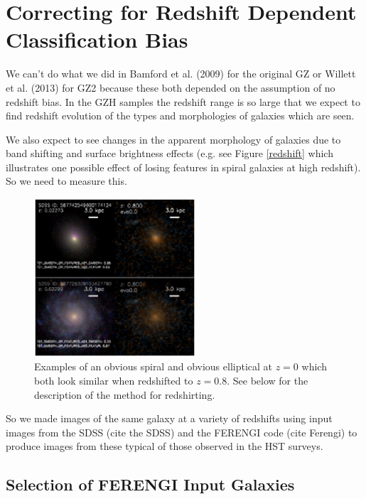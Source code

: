 \documentclass[usenatbib]{mn2e}
\begin{document}
\section{Correcting for Redshift Dependent Classification Bias}

We can't do what we did in Bamford et al. (2009) for the original GZ or Willett et al. (2013) for GZ2 because these both depended on the assumption of no redshift bias. In the GZH samples the redshift range is so large that we expect to find redshift evolution of the types and morphologies of galaxies which are seen. 

We also expect to see changes in the apparent morphology of galaxies due to band shifting and surface brightness effects (e.g. see Figure \ref{redshift} which illustrates one possible effect of losing features in spiral galaxies at high redshift). So we need to measure this. 

\begin{figure}
\includegraphics[width=60mm]{example_ferengi2.ps}
\caption{Examples of an obvious spiral and obvious elliptical at $z=0$ which both look similar when redshifted to $z=0.8$. See below for the description of the method for redshirting.  \label{exampleFERENGI}}
\end{figure}
 


So we made images of the same galaxy at a variety of redshifts using input images from the SDSS (cite the SDSS) and the FERENGI code (cite Ferengi) to produce images from these typical of those observed in the HST surveys. 
 
\subsection{Selection of FERENGI Input Galaxies}
\end{document}
